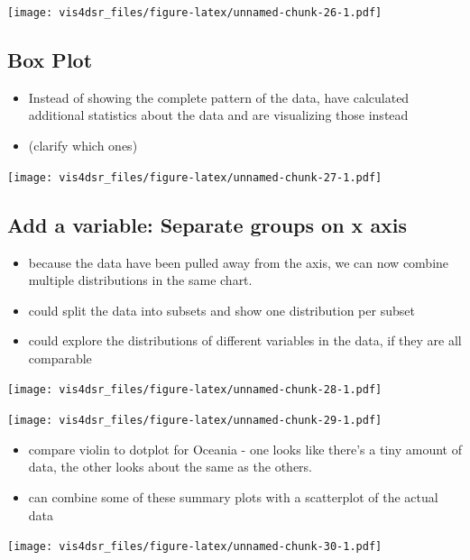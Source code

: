 \documentclass[
]{krantz}
\providecommand{\tightlist}{%
  \setlength{\itemsep}{0pt}\setlength{\parskip}{0pt}}
\begin{document}
\texttt{[image: vis4dsr\_files/figure-latex/unnamed-chunk-26-1.pdf]}

\hypertarget{box-plot}{%
\subsection{Box Plot}\label{box-plot}}

\begin{itemize}
\tightlist
\item
  Instead of showing the complete pattern of the data, have calculated additional
  statistics about the data and are visualizing those instead
\item
  (clarify which ones)
\end{itemize}

\texttt{[image: vis4dsr\_files/figure-latex/unnamed-chunk-27-1.pdf]}

\hypertarget{add-a-variable-separate-groups-on-x-axis}{%
\subsection{Add a variable: Separate groups on x axis}\label{add-a-variable-separate-groups-on-x-axis}}

\begin{itemize}
\tightlist
\item
  because the data have been pulled away from the axis, we can now combine multiple
  distributions in the same chart.
\item
  could split the data into subsets and show one distribution per subset
\item
  could explore the distributions of different variables in the data, if they
  are all comparable
\end{itemize}

\texttt{[image: vis4dsr\_files/figure-latex/unnamed-chunk-28-1.pdf]}

\texttt{[image: vis4dsr\_files/figure-latex/unnamed-chunk-29-1.pdf]}

\begin{itemize}
\tightlist
\item
  compare violin to dotplot for Oceania - one looks like there's a tiny amount of data,
  the other looks about the same as the others.
\item
  can combine some of these summary plots with a scatterplot of the actual data
\end{itemize}

\texttt{[image: vis4dsr\_files/figure-latex/unnamed-chunk-30-1.pdf]}
\end{document}
